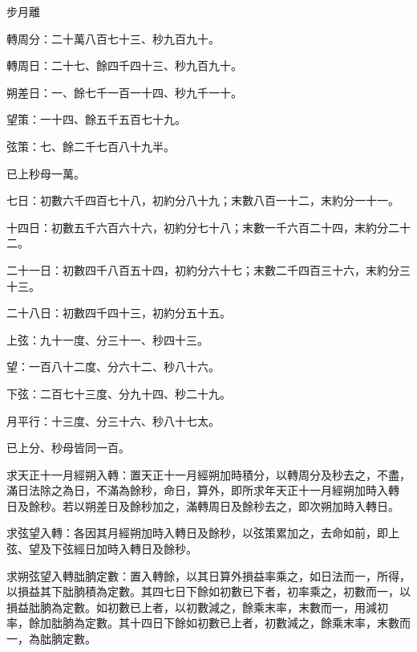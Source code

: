 \begin{pinyinscope}
 步月離



 轉周分：二十萬八百七十三、秒九百九十。



 轉周日：二十七、餘四千四十三、秒九百九十。



 朔差日：一、餘七千一百一十四、秒九千一十。



 望策：一十四、餘五千五百七十九。



 弦策：七、餘二千七百八十九半。



 已上秒母一萬。



 七日：初數六千四百七十八，初約分八十九；末數八百一十二，末約分一十一。



 十四日：初數五千六百六十六，初約分七十八；末數一千六百二十四，末約分二十二。



 二十一日：初數四千八百五十四，初約分六十七；末數二千四百三十六，末約分三十三。



 二十八日：初數四千四十三，初約分五十五。



 上弦：九十一度、分三十一、秒四十三。



 望：一百八十二度、分六十二、秒八十六。



 下弦：二百七十三度、分九十四、秒二十九。



 月平行：十三度、分三十六、秒八十七太。



 已上分、秒母皆同一百。



 求天正十一月經朔入轉：置天正十一月經朔加時積分，以轉周分及秒去之，不盡，滿日法除之為日，不滿為餘秒，命日，算外，即所求年天正十一月經朔加時入轉
 日及餘秒。若以朔差日及餘秒加之，滿轉周日及餘秒去之，即次朔加時入轉日。



 求弦望入轉：各因其月經朔加時入轉日及餘秒，以弦策累加之，去命如前，即上弦、望及下弦經日加時入轉日及餘秒。



 求朔弦望入轉朏朒定數：置入轉餘，以其日算外損益率乘之，如日法而一，所得，以損益其下朏朒積為定數。其四七日下餘如初數已下者，初率乘之，初數而一，以損益朏朒為定數。如初數已上者，以初數減之，餘乘末率，末數而一，用減初
 率，餘加朏朒為定數。其十四日下餘如初數已上者，初數減之，餘乘末率，末數而一，為朏朒定數。




\end{pinyinscope}
